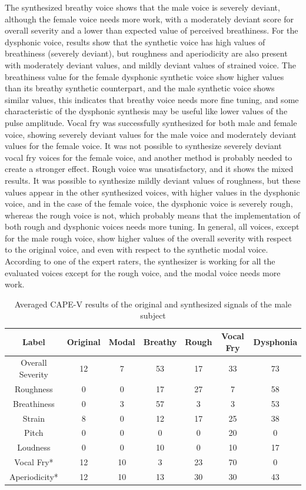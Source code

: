 \documentclass[final,5p,times,twocolumn]{elsarticle}
\begin{document}
The synthesized breathy voice shows that the male voice is severely deviant, although the female voice needs more work, with a moderately deviant score for overall severity and a lower than expected value of perceived breathiness. For the dysphonic voice, results show that the synthetic voice has high values of breathiness (severely deviant), but roughness and aperiodicity are also present with moderately deviant values, and mildly deviant values of strained voice. The breathiness value for the female dysphonic synthetic voice show higher values than its breathy synthetic counterpart, and the male synthetic voice shows similar values, this indicates that breathy voice needs more fine tuning, and some characteristic of the dysphonic synthesis may be useful like lower values of the pulse amplitude. Vocal fry was successfully synthesized for both male and female voice, showing severely deviant values for the male voice and moderately deviant values for the female voice. It was not possible to synthesize severely deviant vocal fry voices for the female voice, and another method is probably needed to create a stronger effect. Rough voice was unsatisfactory, and it shows the mixed results. It was possible to synthesize mildly deviant values of roughness, but these values appear in the other synthesized voices, with higher values in the dysphonic voice, and in the case of the female voice, the dysphonic voice is severely rough, whereas the rough voice is not, which probably means that the implementation of both rough and dysphonic voices needs more tuning. In general, all voices, except for the male rough voice, show higher values of the overall severity with respect to the original voice, and even with respect to the synthetic modal voice. According to one of the expert raters, the synthesizer is working for all the evaluated voices except for the rough voice, and the modal voice needs more work.

\begin{table}[!htpb]
    \centering
    \begin{tabular}{ccccccc}
        \hline \hline
        Label & Original & Modal & Breathy & Rough & Vocal Fry & Dysphonia\\ \hline
        Overall Severity & 12 & 7  & 53 & 17 & 33 & 73 \\
        Roughness        & 0  & 0  & 17 & 27 & 7  & 58 \\
        Breathiness      & 0  & 3  & 57 & 3  & 3  & 53 \\
        Strain           & 8  & 0  & 12 & 17 & 25 & 38 \\
        Pitch            & 0  & 0  & 0  & 0  & 20 & 0  \\
        Loudness         & 0  & 0  & 10 & 0  & 10 & 17 \\
        Vocal Fry*       & 12 & 10 & 3  & 23 & 70 & 0  \\
        Aperiodicity*    & 12 & 10 & 13 & 30 & 30 & 43 \\ \hline \hline
    \end{tabular}
    \caption{Averaged CAPE-V results of the original and synthesized signals of the male subject}
    \label{tab:percassmale}
\end{table}
\end{document}
